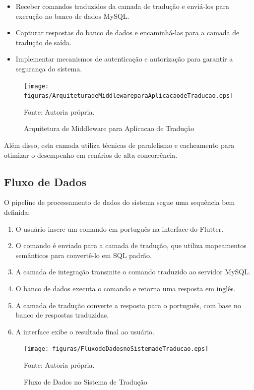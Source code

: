 \begin{itemize}
    \item Receber comandos traduzidos da camada de tradução e enviá-los para execução no banco de dados MySQL.
    \item Capturar respostas do banco de dados e encaminhá-las para a camada de tradução de saída.
    \item Implementar mecanismos de autenticação e autorização para garantir a segurança do sistema.
\end{itemize}

\begin{figure}[H]
    \centering
    \texttt{[image: figuras/ArquiteturadeMiddlewareparaAplicacaodeTraducao.eps]}
    \caption{Arquitetura de Middleware para Aplicacao de Tradução}
    Fonte: Autoria própria.
    \label{fig:ArquiteturadeMiddlewareparaAplicacaodeTraducao}
\end{figure}

Além disso, esta camada utiliza técnicas de paralelismo e cacheamento para otimizar o desempenho em cenários de alta concorrência.

\subsection{Fluxo de Dados}
O pipeline de processamento de dados do sistema segue uma sequência bem definida:

\begin{enumerate}
    \item O usuário insere um comando em português na interface do Flutter.
    \item O comando é enviado para a camada de tradução, que utiliza mapeamentos semânticos para convertê-lo em SQL padrão.
    \item A camada de integração transmite o comando traduzido ao servidor MySQL.
    \item O banco de dados executa o comando e retorna uma resposta em inglês.
    \item A camada de tradução converte a resposta para o português, com base no banco de respostas traduzidas.
    \item A interface exibe o resultado final ao usuário.
\end{enumerate}

\begin{figure}[H]
    \centering
    \texttt{[image: figuras/FluxodeDadosnoSistemadeTraducao.eps]}
    \caption{Fluxo de Dados no Sistema de Tradução}
    Fonte: Autoria própria.
    \label{fig:FluxodeDadosnoSistemadeTraducaoo}
\end{figure}


